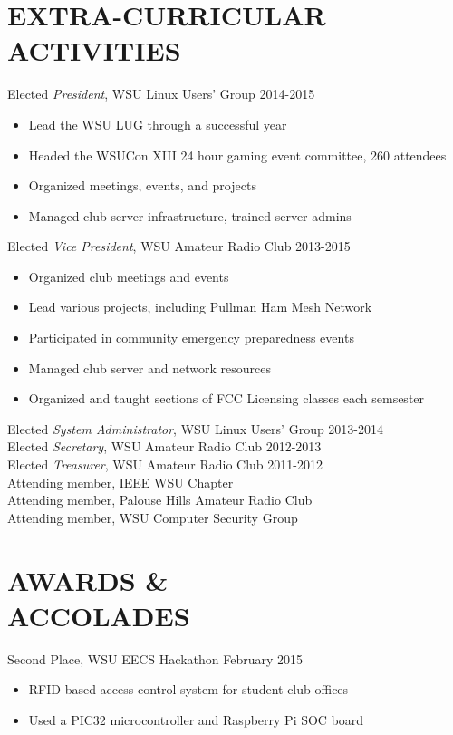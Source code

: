 \documentclass[line, margin]{res}
\begin{document}
\begin{resume}
\section{EXTRA-CURRICULAR \\ ACTIVITIES}             
            Elected {\it President}, WSU Linux Users' Group \hfill 2014-2015
        \begin{itemize} \itemsep -2pt
                \item Lead the WSU LUG through a successful year
                \item Headed the WSUCon XIII 24 hour gaming event committee, 260 attendees
                \item Organized meetings, events, and projects
                \item Managed club server infrastructure, trained server admins
            \end{itemize}
            Elected {\it Vice President}, WSU Amateur Radio Club \hfill 2013-2015
        \begin{itemize} \itemsep -2pt
                \item Organized club meetings and events
                \item Lead various projects, including Pullman Ham Mesh Network
                \item Participated in community emergency preparedness events
                \item Managed club server and network resources
                \item Organized and taught sections of FCC Licensing classes each semsester
            \end{itemize}

            Elected {\it System Administrator}, WSU Linux Users' Group \hfill 2013-2014\\
            Elected {\it Secretary}, WSU Amateur Radio Club \hfill 2012-2013\\
            Elected {\it Treasurer}, WSU Amateur Radio Club \hfill 2011-2012\\
            Attending member, IEEE WSU Chapter\\
            Attending member, Palouse Hills Amateur Radio Club\\
            Attending member, WSU Computer Security Group

\section{AWARDS \& \\ ACCOLADES}
            Second Place, WSU EECS Hackathon \hfill February 2015
        \begin{itemize} \itemsep -2pt
                \item RFID based access control system for student club offices
                \item Used a PIC32 microcontroller and Raspberry Pi SOC board
            \end{itemize}

\end{resume}
\end{document}
